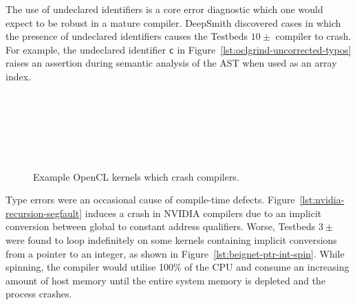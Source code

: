 The use of undeclared identifiers is a core error diagnostic which one would expect to be robust in a mature compiler. DeepSmith discovered cases in which the presence of undeclared identifiers causes the Testbeds $10\pm$ compiler to crash. For example, the undeclared identifier \texttt{c} in Figure~\ref{lst:oclgrind-uncorrected-typos} raises an assertion during semantic analysis of the AST when used as an array index.


\begin{figure}
  \centering %
  \\%
  \\%
  \\%
  \\%
  \\%
  \caption[Example OpenCL kernels which crash compilers]{%
    Example OpenCL kernels which crash compilers.%
  }%
\end{figure}

Type errors were an occasional cause of compile-time defects. Figure~\ref{lst:nvidia-recursion-segfault} induces a crash in NVIDIA compilers due to an implicit conversion between global to constant address qualifiers. Worse, Testbeds $3\pm$ were found to loop indefinitely on some kernels containing implicit conversions from a pointer to an integer, as shown in Figure~\ref{lst:beignet-ptr-int-spin}. While spinning, the compiler would utilise 100\% of the CPU and consume an increasing amount of host memory until the entire system memory is depleted and the process crashes.

